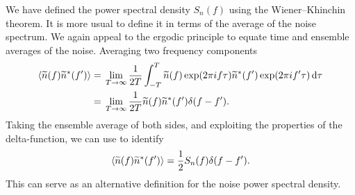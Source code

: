 We have defined the power spectral density $S_n(f)$ using the Wiener--Khinchin theorem. It is more usual to define it in terms of the average of the noise spectrum. We again appeal to the ergodic principle to equate time and ensemble averages of the noise. Averaging two frequency components
\begin{align}
\left\langle\widetilde{n}(f)\widetilde{n}^\ast(f')\right\rangle = {} & \lim_{T \rightarrow \infty} \dfrac{1}{2T} \int_{-T}^{T}{\widetilde{n}(f)\exp(2\pi i f \tau)\widetilde{n}^\ast(f')\exp(2\pi i f' \tau)}\,\mathrm{d}{\tau} \nonumber \\
 = {} & \lim_{T \rightarrow \infty} \dfrac{1}{2T} \widetilde{n}(f)\widetilde{n}^\ast(f')\delta(f-f').
\end{align}
Taking the ensemble average of both sides, and exploiting the properties of the delta-function, we can use  to identify \citep{Cutler1994}
\begin{equation}
\left\langle\widetilde{n}(f)\widetilde{n}^\ast(f')\right\rangle = \dfrac{1}{2} S_n(f)\delta(f-f').
\end{equation}
This can serve as an alternative definition for the noise power spectral density.



